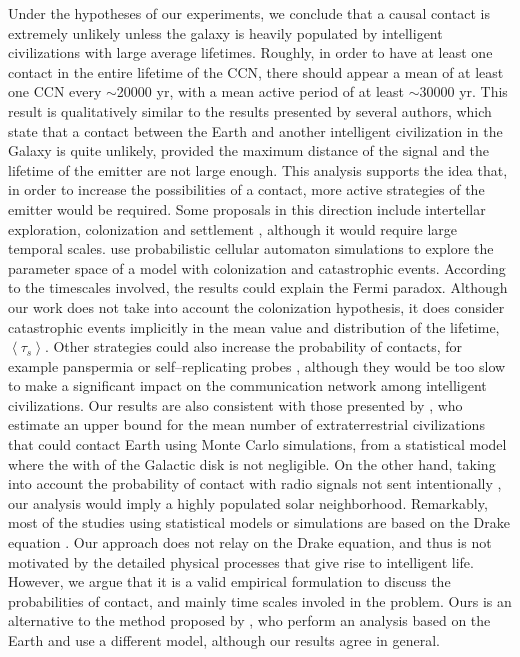 \documentclass[crop]{CSLB}
\newcommand{\ceti}{CCN}
\begin{document}
Under the hypotheses of our experiments, we conclude that a causal
contact is extremely unlikely unless the galaxy is heavily populated
by intelligent civilizations with large average lifetimes.
%
Roughly, in order to have at least one contact in the entire lifetime
of the \ceti{}, there should appear a mean of at least one \ceti{}
every $\sim$20000 yr, with a mean active period of at least
$\sim$30000 yr.
%
This result is qualitatively similar to the results presented by
several authors, which state that a contact between the Earth and
another intelligent civilization in the Galaxy is quite unlikely,
provided the maximum distance of the signal and the lifetime of the
emitter are not large enough.
%
This analysis supports the idea that, in order to increase the
possibilities of a contact, more active strategies of the emitter
would be required.
%
Some proposals in this direction include intertellar exploration,
colonization and settlement \citep{brin_great_1983, Dosovic2019,
galera_invasion_2019}, although it would require large temporal
scales.
%
\citet{Dosovic2019} use probabilistic cellular automaton simulations
to explore the parameter space of a model with colonization and
catastrophic events.
%
According to the timescales involved, the results could explain the
Fermi paradox.
%
Although our work does not take into account the colonization
hypothesis, it does consider catastrophic events implicitly in the
mean value and distribution of the lifetime, $\left<\tau_s\right>$.
%
Other strategies could also increase the probability of contacts, for
example panspermia \citep[e.g.,][]{starling_virulence_2013} or
self--replicating probes \citep[e.g.,][]{barlow_galactic_2013},
although they would be too slow to make a significant impact on the
communication network among intelligent civilizations.
%
Our results are also consistent with those presented by
\citet{grimaldi_signal_2017}, who estimate an upper bound for the mean
number of extraterrestrial civilizations that could contact Earth
using Monte Carlo simulations, from a statistical model where the with
of the Galactic disk is not negligible.
%
On the other hand, taking into account the probability of contact with
radio signals not sent intentionally \citep{horvat_calculating_2007},
our analysis would imply a highly populated solar neighborhood.
%
Remarkably, most of the studies using statistical models or
simulations are based on the Drake equation
\citep{cirkovic_temporal_2004, smith_broadcasting_2009,
bloetscher_using_2019}.
%
Our approach does not relay on the Drake equation, and thus is not
motivated by the detailed physical processes that give rise to
intelligent life.
%
However, we argue that it is a valid empirical formulation to discuss
the probabilities of contact, and mainly time scales involed in the
problem.
%
Ours is an alternative to the method proposed by
\citet{balbi_impact_2018}, who perform an analysis based on the Earth
and use a different model, although our results agree in general.
\end{document}
